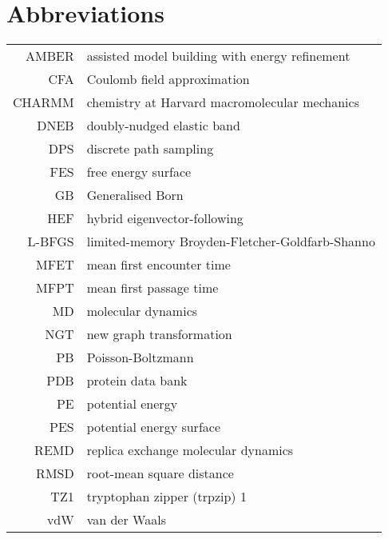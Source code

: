 \chapter*{\sc Abbreviations}
\begin{longtable}{r >{\rule{0pt}{3ex}}l<{\rule[-1.5ex]{0pt}{0pt}}}
AMBER &  assisted model building with energy refinement \\
CFA & Coulomb field approximation \\
CHARMM & chemistry at Harvard macromolecular mechanics \\
DNEB & doubly-nudged elastic band \\
DPS & discrete path sampling \\
FES & free energy surface \\
GB & Generalised Born \\
HEF & hybrid eigenvector-following \\
L-BFGS & limited-memory Broyden-Fletcher-Goldfarb-Shanno \\
MFET & mean first encounter time \\
MFPT & mean first passage time \\
MD & molecular dynamics \\
NGT & new graph transformation \\
PB & Poisson-Boltzmann \\
PDB & protein data bank \\
PE & potential energy \\
PES & potential energy surface \\
REMD & replica exchange molecular dynamics \\
RMSD & root-mean square distance \\
TZ1 & tryptophan zipper (trpzip) 1 \\
vdW & van der Waals \\

\end{longtable}

